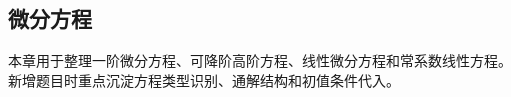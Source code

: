 \subsection{微分方程}

\begin{knowledgeBox}
本章用于整理一阶微分方程、可降阶高阶方程、线性微分方程和常系数线性方程。新增题目时重点沉淀方程类型识别、通解结构和初值条件代入。
\end{knowledgeBox}
